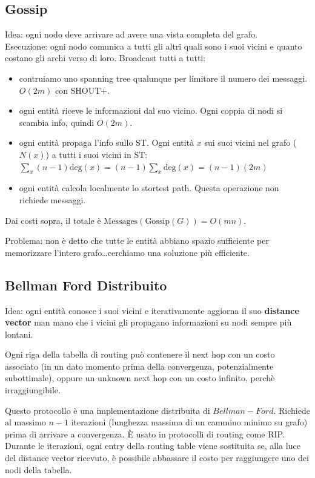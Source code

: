 \subsection{Gossip}
Idea: ogni nodo deve arrivare ad avere una vista completa del grafo. \\
Esecuzione: ogni nodo comunica a tutti gli altri quali sono i suoi vicini e quanto costano gli archi verso di loro.
Broadcast tutti a tutti:
\begin{itemize}
  \item contruiamo uno spanning tree qualunque per limitare il numero dei messaggi. $O(2m)$ con SHOUT+.
  \item ogni entità riceve le informazioni dal suo vicino. Ogni coppia di nodi si scambia info, quindi $O(2m)$.
  \item ogni entità propaga l'info sullo ST. Ogni entità $x$ sui suoi vicini nel grafo ($N(x)$) a tutti i suoi vicini in ST: $\sum_x (n-1) \text{deg}(x) = (n-1) \sum_x \text{deg}(x) = (n-1) (2m)$
  \item ogni entità calcola localmente lo stortest path. Questa operazione non richiede messaggi.
\end{itemize}

Dai costi sopra, il totale è $\text{Messages}(\text{Gossip}(G)) = O(mn)$.

Problema: non è detto che tutte le entità abbiano spazio sufficiente per memorizzare l'intero grafo\dots cerchiamo una soluzione più efficiente.

\subsection{Bellman Ford Distribuito}
Idea: ogni entità conosce i suoi vicini e iterativamente aggiorna il suo \textbf{distance vector} man mano che i vicini gli propagano informazioni
su nodi sempre più lontani.

Ogni riga della tabella di routing può contenere il next hop con un costo associato (in un dato momento prima della convergenza,
potenzialmente subottimale), oppure un unknown next hop con un costo infinito, perchè irraggiungibile.

Questo protocollo è una implementazione distribuita di $Bellman-Ford$. Richiede al massimo $n-1$ iterazioni (lunghezza massima di un cammino
minimo su grafo) prima di arrivare a convergenza. È usato in protocolli di routing come RIP. Durante le iterazioni, ogni entry della routing
table viene sostituita se, alla luce del distance vector ricevuto, è possibile abbassare il costo per raggiungere uno dei nodi della tabella.

